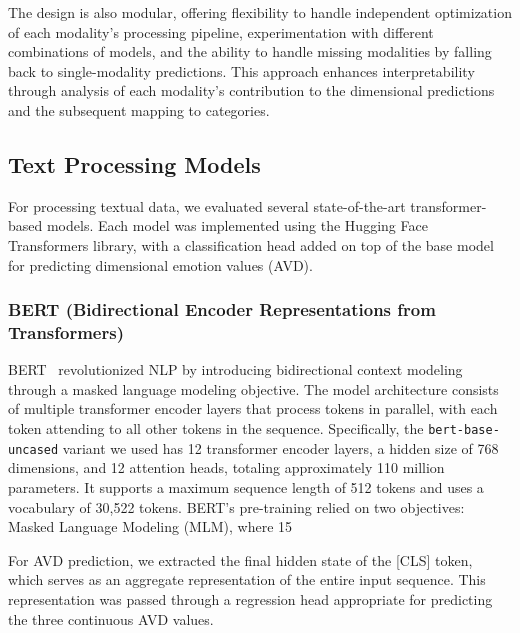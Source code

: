 \documentclass[12pt]{article}
\begin{document}
The design is also modular, offering flexibility to handle independent optimization of each modality's processing pipeline, experimentation with different combinations of models, and the ability to handle missing modalities by falling back to single-modality predictions. This approach enhances interpretability through analysis of each modality's contribution to the dimensional predictions and the subsequent mapping to categories.

\subsection{Text Processing Models}
For processing textual data, we evaluated several state-of-the-art transformer-based models. Each model was implemented using the Hugging Face Transformers library, with a classification head added on top of the base model for predicting dimensional emotion values (AVD).

\subsubsection{BERT (Bidirectional Encoder Representations from Transformers)}
BERT~\cite{devlin2018bert} revolutionized NLP by introducing bidirectional context modeling through a masked language modeling objective. The model architecture consists of multiple transformer encoder layers that process tokens in parallel, with each token attending to all other tokens in the sequence. Specifically, the \texttt{bert-base-uncased} variant we used has 12 transformer encoder layers, a hidden size of 768 dimensions, and 12 attention heads, totaling approximately 110 million parameters. It supports a maximum sequence length of 512 tokens and uses a vocabulary of 30,522 tokens. BERT's pre-training relied on two objectives: Masked Language Modeling (MLM), where 15%

For AVD prediction, we extracted the final hidden state of the [CLS] token, which serves as an aggregate representation of the entire input sequence. This representation was passed through a regression head appropriate for predicting the three continuous AVD values.
\end{document}
